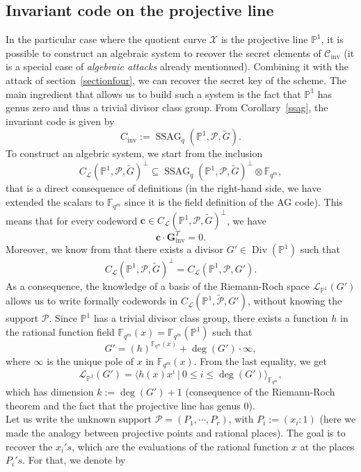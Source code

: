 \documentclass[10pt]{article}
\theoremstyle{definition}
\theoremstyle{definition}
\theoremstyle{definition}
\newcommand{\cd}{\cdot}
\newcommand{\C}{\mathcal{C}}
\newcommand{\PP}{\mathbb{P}}
\newcommand{\Fqm}{\mathbb{F}_{q^m}}
\newcommand{\su}{\subseteq}
\newcommand{\X}{\mathcal{X}}
\newcommand{\PR}{\mathcal{P}}
\newcommand{\Div}{\operatorname{Div}}
\newcommand{\ssag}{\operatorname{SSAG}}
\newcommand{\calL}{\mathcal{L}}
\begin{document}
\subsection{Invariant code on the projective line} \label{section6.1}


In the particular case where the quotient curve $\X$ is the projective line $\PP^1$, it is possible to construct an algebraic system to recover the secret elements of $\C_{\mathrm{inv}}$ (it is a special case of \textit{algebraic attacks} already mentionned). Combining it with the attack of section~\ref{sectionfour}, we can  recover the secret key of the scheme. The main ingredient that allows us to build such a system is the fact that $\PP^1$ has genus zero and thus a trivial divisor class group. 
From Corollary~\ref{ssag}, the invariant code is given by 
\[C_{\mathrm{inv}} := \ssag_q(\PP^1,\PR,\tilde{G}).\]
To construct an algebric system, we start from the inclusion 
\[C_{\calL}(\PP^1,\PR,\tilde{G})^{\perp} \su \ssag_q(\PP^1,\PR,\tilde{G})^{\perp} \otimes \Fqm,\]
that is a direct consequence of definitions (in the right-hand side, we have extended the scalars to $\Fqm$ since it is the field definition of the AG code). This means that for every codeword $\mathbf{c} \in C_{\calL}(\PP^1,\PR,\tilde{G})^{\perp}$, we have 
\begin{equation} \label{eq12}
\mathbf{c} \cd \mathbf{G}_{\mathrm{inv}}^T = 0.
\end{equation} 
Moreover, we know from \cite[Prop.~2.2.10]{Sti} that there exists a divisor $G' \in \Div(\PP^1)$ such that
\[ C_{\calL}(\PP^1,\PR,\tilde{G})^{\perp} = C_{\calL}(\PP^1,\PR,G').\]
As a consequence, the knowledge of a basis of the Riemann-Roch space $\calL_{\mathbb{P}^1}(G')$ allows us to write formally codewords in $C_{\calL}(\PP^1,\tilde{\PR},G')$, without knowing the support $\PR$. Since $\PP^1$ has a trivial divisor class group, there exists a function $h$ in the rational function field $\Fqm(x) = \Fqm(\PP^1)$ such that
\[ G' = (h)^{\Fqm(x)} + \deg(G') \cd \infty,\]
where $\infty$ is the unique pole of $x$ in $\Fqm(x)$. From the last equality, we get
\[\calL_{\mathbb{P}^1}(G') = \langle h(x)x^i \ | \ 0 \leq i \leq \deg(G')\rangle_{\Fqm},\]
which has dimension $k:=\deg(G')+1$ (consequence of the Riemann-Roch theorem and the fact that the projective line has genus $0$). \\
Let us write the unknown support $\PR = (P_1,\cdots,P_r)$, with $P_i := (x_i:1)$ (here we made the analogy between projective points and rational places). The goal is to recover the $x_i's$, which are the evaluations of the rational function $x$ at the places $P_i's$. For that, we denote by  
\end{document}
